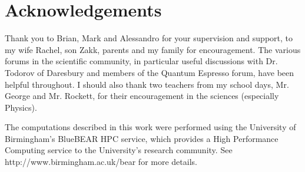 \chapter{Acknowledgements}

Thank you to Brian, Mark and Alessandro for your supervision and support, to my wife Rachel, son Zakk, parents and my family for encouragement.  The various forums in the scientific community, in particular useful discussions with Dr. Todorov of Daresbury and members of the Quantum Espresso forum, have been helpful throughout.  I should also thank two teachers from my school days, Mr. George and Mr. Rockett, for their encouragement in the sciences (especially Physics).

The computations described in this work were performed using the University of Birmingham's BlueBEAR HPC service, which provides a High Performance Computing service to the University's research community. See http://www.birmingham.ac.uk/bear for more details.




